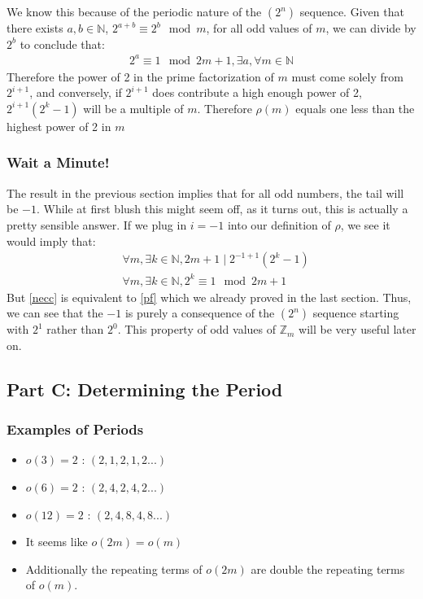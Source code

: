 \documentclass{article}
\begin{document}
  We know this because of the periodic nature of the $(2^n)$ sequence. Given that there exists $a, b \in \mathbb{N}$, $2^{a+b} \equiv 2^b \mod m$, for all odd values of $m$, we can divide by $2^b$ to conclude that:
  \begin{align}
    2^a \equiv 1 \mod 2m+1, \exists a, \forall m \in \mathbb{N} \label{pf}
  \end{align}
  Therefore the power of 2 in the prime factorization of $m$ must come solely from $2^{i+1}$, and conversely, if $2^{i+1}$ does contribute a high enough power of 2, $2^{i+1}(2^k-1)$ will be a multiple of $m$. Therefore $\rho(m)$ equals one less than the highest power of 2 in $m$
  \subsubsection{Wait a Minute!}
  The result in the previous section implies that for all odd numbers, the tail will be $-1$. While at first blush this might seem off, as it turns out, this is actually a pretty sensible answer. If we plug in $i = -1$ into our definition of $\rho$, we see it would imply that:
  \begin{align}
    &\forall m, \exists k \in \mathbb{N}, 2m+1 \mid 2^{-1+1}(2^k - 1)\\
    &\forall m, \exists k \in \mathbb{N}, 2^k \equiv 1 \mod 2m+1 \label{necc}
  \end{align}
  But \eqref{necc} is equivalent to \eqref{pf} which we already proved in the last section. Thus, we can see that the $-1$ is purely a consequence of the $(2^n)$ sequence starting with $2^1$ rather than $2^0$. This property of odd values of $\mathbb{Z}_m$ will be very useful later on.
  \subsection{Part C: Determining the Period}
  \subsubsection{Examples of Periods}
  \begin{itemize}
  \item $o(3) = 2$ : $(2, 1, 2, 1, 2 ...)$
  \item $o(6) = 2$ : $(2, 4, 2, 4, 2 ...)$
  \item $o(12)= 2$ : $(2, 4, 8, 4, 8 ...)$
  \item It seems like $o(2m) = o(m)$
  \item Additionally the repeating terms of $o(2m)$ are double the repeating terms of $o(m)$.
  \end{itemize}
\end{document}
